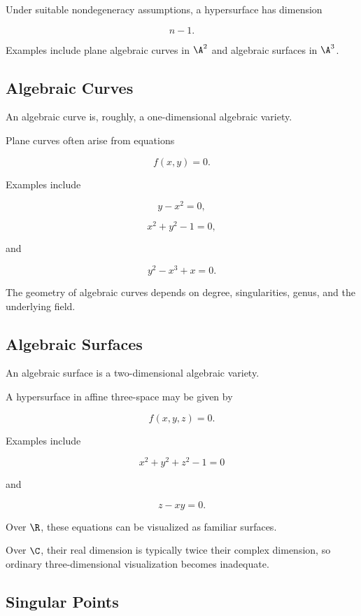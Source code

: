 Under suitable nondegeneracy assumptions, a hypersurface has dimension

\[
\boxed{
n-1.
}
\]

Examples include plane algebraic curves in \(\A^2\) and algebraic surfaces
in \(\A^3\).

\subsection{Algebraic Curves}
\label{subsec:algebraic-curves}

An algebraic curve is, roughly, a one-dimensional algebraic variety.

Plane curves often arise from equations

\[
\boxed{
f(x,y)=0.
}
\]

Examples include

\[
y-x^2=0,
\]

\[
x^2+y^2-1=0,
\]

and

\[
y^2-x^3+x=0.
\]

The geometry of algebraic curves depends on degree, singularities, genus,
and the underlying field.

\subsection{Algebraic Surfaces}
\label{subsec:algebraic-surfaces}

An algebraic surface is a two-dimensional algebraic variety.

A hypersurface in affine three-space may be given by

\[
\boxed{
f(x,y,z)=0.
}
\]

Examples include

\[
x^2+y^2+z^2-1=0
\]

and

\[
z-xy=0.
\]

Over \(\R\), these equations can be visualized as familiar surfaces.

Over \(\C\), their real dimension is typically twice their complex
dimension, so ordinary three-dimensional visualization becomes inadequate.

\subsection{Singular Points}
\label{subsec:algebraic-singular-points}

